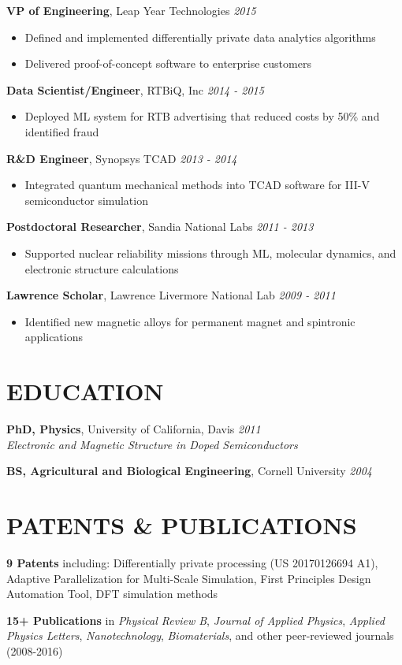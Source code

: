\documentclass[10pt, letterpaper]{article}
\begin{document}
\noindent\textbf{VP of Engineering}, {\color{mycolor2}Leap Year Technologies} \hfill \textit{2015}
\begin{itemize}
\item Defined and implemented differentially private data analytics algorithms
\item Delivered proof-of-concept software to enterprise customers
\end{itemize}

\noindent\textbf{Data Scientist/Engineer}, {\color{mycolor2}RTBiQ, Inc} \hfill \textit{2014 - 2015}
\begin{itemize}
\item Deployed ML system for RTB advertising that reduced costs by 50\% and identified fraud
\end{itemize}

\noindent\textbf{R\&D Engineer}, {\color{mycolor2}Synopsys TCAD} \hfill \textit{2013 - 2014}
\begin{itemize}
\item Integrated quantum mechanical methods into TCAD software for III-V semiconductor simulation
\end{itemize}

\noindent\textbf{Postdoctoral Researcher}, {\color{mycolor2}Sandia National Labs} \hfill \textit{2011 - 2013}
\begin{itemize}
\item Supported nuclear reliability missions through ML, molecular dynamics, and electronic structure calculations
\end{itemize}

\noindent\textbf{Lawrence Scholar}, {\color{mycolor2}Lawrence Livermore National Lab} \hfill \textit{2009 - 2011}
\begin{itemize}
\item Identified new magnetic alloys for permanent magnet and spintronic applications
\end{itemize}

\section{EDUCATION}

\noindent\textbf{PhD, Physics}, University of California, Davis \hfill \textit{2011}\\
\textit{Electronic and Magnetic Structure in Doped Semiconductors}

\noindent\textbf{BS, Agricultural and Biological Engineering}, Cornell University \hfill \textit{2004}

\section{PATENTS \& PUBLICATIONS}

\noindent\textbf{9 Patents} including: Differentially private processing (US 20170126694 A1), Adaptive Parallelization for Multi-Scale Simulation, First Principles Design Automation Tool, DFT simulation methods

\noindent\textbf{15+ Publications} in \textit{Physical Review B}, \textit{Journal of Applied Physics}, \textit{Applied Physics Letters}, \textit{Nanotechnology}, \textit{Biomaterials}, and other peer-reviewed journals (2008-2016)
\end{document}

